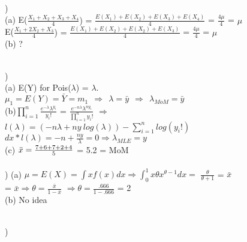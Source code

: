 \documentclass[12pt]{article}
\begin{document}
\noindent \hrulefill \\


)\\
\indent (a) E({\Large{$\frac{X_1+X_2+X_3+X_4}{4}$}) = $\frac{E(X_1)+E(X_2)+E(X_3)+E(X_4)}{4}$} = {\Large $\frac{4\mu}{4}$} = $\mu$\\[.4em]
\indent \indent E({\Large{$\frac{X_1+2X_2+X_3}{4}$}) = $\frac{E(X_1)+E(X_2)+E(X_2)+E(X_3)}{4}$} = {\Large $\frac{4\mu}{4}$} = $\mu$\\[.4em]

\indent (b) ?


\noindent \hrulefill \\


) \\
\indent (a) E(Y) for Pois($\lambda$) = $\lambda$. \\
\indent \indent $\mu_1 = E(Y) = \bar{Y} = m_1 \ \ \Rightarrow \ \ \lambda = \bar{y} \ \ \Rightarrow\ \  \lambda_{MoM} = \bar{y}$\\

\indent (b){\Large$\prod_{i=1}^{n}  \frac{e^{-\lambda}\lambda^{y_i}}{y_i!}$} = {\Large$ \frac{e^{-n\lambda}\lambda^{ny_i}}{\prod_{i=1}^{n}y_i!}$} $\Rightarrow$\\[.4em]
\indent \indent $l(\lambda) = (-n\lambda + ny\ log(\lambda) ) - \sum_{i=1}^{n}log(y_i!)$\\[.4em]
\indent \indent $dx * l(\lambda) = -n + \frac{ny}{\lambda} = 0 \Rightarrow \lambda_{MLE} = y $\\

\indent (c) $\bar{x} = {\Large\frac{7 + 6 + 7 + 2 + 4}{5}}$ = 5.2 = MoM\\


\noindent \hrulefill \\


)
\indent (a) $\mu = E(X) = \int xf(x)dx \Rightarrow \int_0^1x\theta x^{\theta-1}dx =$ {\Large $\frac{\theta}{\theta+1}$} = $\bar{x}$\\[.4em]
\indent {} = $\bar{x} \Rightarrow \theta = ${\Large $\frac{\bar{x}}{1-\bar{x}}$} $\Rightarrow \theta = ${\Large $\frac{.666}{1-.666}$} = 2\\

\indent (b) No idea


\noindent \hrulefill \\


) 
\end{document}
